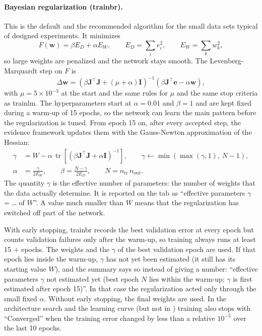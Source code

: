 \paragraph{Bayesian regularization (trainbr).} This is the default and the recommended algorithm for the small
data sets typical of designed experiments. It minimizes \citep{mackay1992,foresee1997}
\begin{equation}
  F(\mathbf{w}) = \beta E_D + \alpha E_W, \qquad E_D = \sum_i e_i^2, \qquad E_W = \sum_k w_k^2,
  \label{eq:ch07-br}
\end{equation}
so large weights are penalized and the network stays smooth. The Levenberg-Marquardt step on $F$ is
\begin{equation}
  \Delta\mathbf{w} = \left(\beta\mathbf{J}^\top\mathbf{J} + (\mu+\alpha)\mathbf{I}\right)^{-1}
  \left(\beta\mathbf{J}^\top\mathbf{e} - \alpha\mathbf{w}\right), \label{eq:ch07-brstep}
\end{equation}
with $\mu = 5\times10^{-3}$ at the start and the same rules for $\mu$ and the same stop criteria as trainlm. The
hyperparameters start at $\alpha = 0.01$ and $\beta = 1$ and are kept fixed during a warm-up of 15 epochs, so the
network can learn the main pattern before the regularization is tuned. From epoch 15 on, after every accepted
step, the evidence framework updates them with the Gauss-Newton approximation of the Hessian:
\begin{align}
  \gamma &= W - \alpha\,\operatorname{tr}\!\left[\left(\beta\mathbf{J}^\top\mathbf{J} + \alpha\mathbf{I}\right)^{-1}
  \right], \qquad \gamma \leftarrow \min\!\left(\max(\gamma, 1),\, N-1\right), \label{eq:ch07-gamma}\\
  \alpha &= \frac{\gamma}{2E_W}, \qquad \beta = \frac{N-\gamma}{2E_D}, \qquad N = n_\text{tr}\,n_\text{out}.
  \label{eq:ch07-alphabeta}
\end{align}
The quantity $\gamma$ is the effective number of parameters: the number of weights that the data actually
determine. It is reported on the  tab as ``effective parameters $\gamma$ = \dots{} of
$W$''. A value much smaller than $W$ means that the regularization has switched off part of the network.

With early stopping, trainbr records the best validation error at every epoch but counts validation failures
only after the warm-up, so training always runs at least 15 +  epochs. The weights
and the $\gamma$ of the best validation epoch are used. If that epoch lies inside the warm-up, $\gamma$ has not
yet been estimated (it still has its starting value $W$), and the summary says so instead of giving a number:
``effective parameters $\gamma$ not estimated yet (best epoch $N$ lies within the warm-up; $\gamma$ is first
estimated after epoch 15)''. In that case the regularization acted only through the small fixed $\alpha$. Without early stopping, the final weights are used. In the architecture search and the learning curve
(but not in ) training also stops with ``Converged'' when the training error changed by less than a
relative $10^{-5}$ over the last 10 epochs.


